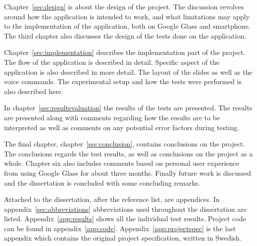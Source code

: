 Chapter~\ref{sec:design} is about the design of the project. The discussion revolves around how the application is intended to work, and what limitations may apply to the implementation of the application, both on Google Glass and smartphone. The third chapter also discusses the design of the tests done on the application.

Chapter~\ref{sec:implementation} describes the implementation part of the project. The flow of the application is described in detail. Specific aspect of the application is also described in more detail. The layout of the slides as well as the voice commands. The experimental setup and how the tests were performed is also described here.

In chapter~\ref{sec:resultevaluation} the results of the tests are presented. The results are presented along with comments regarding how the results are to be interpreted as well as comments on any potential error factors during testing.

The final chapter, chapter~\ref{sec:conclusion}, contains conclusions on the project. The conclusions regards the test results, as well as conclusions on the project as a whole. Chapter six also includes comments based on personal user experience from using Google Glass for about three months. Finally future work is discussed and the dissertation is concluded with some concluding remarks.

Attached to the dissertation, after the reference list, are appendices. In appendix~\ref{sec:abbreviations} abbreviations used throughout the dissertation are listed. Appendix~\ref{app:results} shows all the individual test results. Project code can be found in appendix~\ref{app:code}. Appendix~\ref{app:projectspec} is the last appendix which contains the original project specification, written in Swedish.